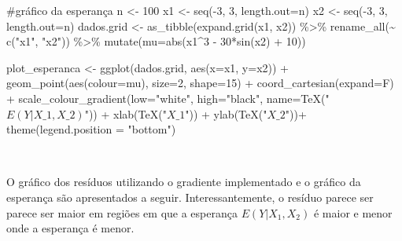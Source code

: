 \documentclass[
  a4paperpaper,
]{article}
\newenvironment{Shaded}{\begin{snugshade}}{\end{snugshade}}
\newcommand{\AttributeTok}[1]{\textcolor[rgb]{0.40,0.45,0.13}{#1}}
\newcommand{\CommentTok}[1]{\textcolor[rgb]{0.37,0.37,0.37}{#1}}
\newcommand{\DecValTok}[1]{\textcolor[rgb]{0.68,0.00,0.00}{#1}}
\newcommand{\FunctionTok}[1]{\textcolor[rgb]{0.28,0.35,0.67}{#1}}
\newcommand{\NormalTok}[1]{\textcolor[rgb]{0.00,0.23,0.31}{#1}}
\newcommand{\OtherTok}[1]{\textcolor[rgb]{0.00,0.23,0.31}{#1}}
\newcommand{\SpecialCharTok}[1]{\textcolor[rgb]{0.37,0.37,0.37}{#1}}
\newcommand{\StringTok}[1]{\textcolor[rgb]{0.13,0.47,0.30}{#1}}
\begin{document}
\begin{Shaded}
\begin{Highlighting}[]
\CommentTok{\#gráfico da esperança}
\NormalTok{n }\OtherTok{\textless{}{-}} \DecValTok{100}
\NormalTok{x1 }\OtherTok{\textless{}{-}} \FunctionTok{seq}\NormalTok{(}\SpecialCharTok{{-}}\DecValTok{3}\NormalTok{, }\DecValTok{3}\NormalTok{, }\AttributeTok{length.out=}\NormalTok{n)}
\NormalTok{x2 }\OtherTok{\textless{}{-}} \FunctionTok{seq}\NormalTok{(}\SpecialCharTok{{-}}\DecValTok{3}\NormalTok{, }\DecValTok{3}\NormalTok{, }\AttributeTok{length.out=}\NormalTok{n)}
\NormalTok{dados.grid }\OtherTok{\textless{}{-}} \FunctionTok{as\_tibble}\NormalTok{(}\FunctionTok{expand.grid}\NormalTok{(x1, x2)) }\SpecialCharTok{\%\textgreater{}\%}
  \FunctionTok{rename\_all}\NormalTok{(}\SpecialCharTok{\textasciitilde{}} \FunctionTok{c}\NormalTok{(}\StringTok{"x1"}\NormalTok{, }\StringTok{"x2"}\NormalTok{)) }\SpecialCharTok{\%\textgreater{}\%}
  \FunctionTok{mutate}\NormalTok{(}\AttributeTok{mu=}\FunctionTok{abs}\NormalTok{(x1}\SpecialCharTok{\^{}}\DecValTok{3} \SpecialCharTok{{-}} \DecValTok{30}\SpecialCharTok{*}\FunctionTok{sin}\NormalTok{(x2) }\SpecialCharTok{+} \DecValTok{10}\NormalTok{))}

\NormalTok{plot\_esperanca }\OtherTok{\textless{}{-}} \FunctionTok{ggplot}\NormalTok{(dados.grid, }\FunctionTok{aes}\NormalTok{(}\AttributeTok{x=}\NormalTok{x1, }\AttributeTok{y=}\NormalTok{x2)) }\SpecialCharTok{+}
  \FunctionTok{geom\_point}\NormalTok{(}\FunctionTok{aes}\NormalTok{(}\AttributeTok{colour=}\NormalTok{mu), }\AttributeTok{size=}\DecValTok{2}\NormalTok{, }\AttributeTok{shape=}\DecValTok{15}\NormalTok{) }\SpecialCharTok{+}
  \FunctionTok{coord\_cartesian}\NormalTok{(}\AttributeTok{expand=}\NormalTok{F) }\SpecialCharTok{+}
  \FunctionTok{scale\_colour\_gradient}\NormalTok{(}\AttributeTok{low=}\StringTok{"white"}\NormalTok{,}
  \AttributeTok{high=}\StringTok{"black"}\NormalTok{,}
  \AttributeTok{name=}\FunctionTok{TeX}\NormalTok{(}\StringTok{"$E(Y|X\_1, X\_2)$"}\NormalTok{)) }\SpecialCharTok{+}
  \FunctionTok{xlab}\NormalTok{(}\FunctionTok{TeX}\NormalTok{(}\StringTok{"$X\_1$"}\NormalTok{)) }\SpecialCharTok{+} \FunctionTok{ylab}\NormalTok{(}\FunctionTok{TeX}\NormalTok{(}\StringTok{"$X\_2$"}\NormalTok{))}\SpecialCharTok{+}
  \FunctionTok{theme}\NormalTok{(}\AttributeTok{legend.position =} \StringTok{"bottom"}\NormalTok{)}
\end{Highlighting}
\end{Shaded}

~

O gráfico dos resíduos utilizando o gradiente implementado e o gráfico
da esperança são apresentados a seguir. Interessantemente, o resíduo
parece ser parece ser maior em regiões em que a esperança
\(E(Y |X_1, X_2)\) é maior e menor onde a esperança é menor.
\end{document}
